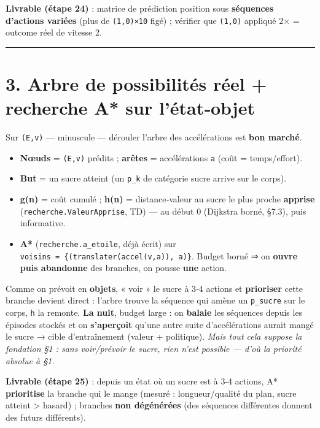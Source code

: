 \documentclass[
  french,
  11pt,
]{article}
\providecommand{\tightlist}{%
  \setlength{\itemsep}{0pt}\setlength{\parskip}{0pt}}
\begin{document}
\textbf{Livrable (étape 24)} : matrice de prédiction position sous
\textbf{séquences d'actions variées} (plus de \texttt{(1,0)×10} figé) ;
vérifier que \texttt{(1,0)} appliqué 2× = outcome réel de vitesse 2.

\begin{center}\rule{0.5\linewidth}{0.5pt}\end{center}

\section{3. Arbre de possibilités réel + recherche A* sur
l'état‑objet}\label{arbre-de-possibilituxe9s-ruxe9el-recherche-a-sur-luxe9tatobjet}

Sur \texttt{(E,v)} --- minuscule --- dérouler l'arbre des accélérations
est \textbf{bon marché}.

\begin{itemize}
\tightlist
\item
  \textbf{Nœuds} = \texttt{(E,v)} prédits ; \textbf{arêtes} =
  accélérations \texttt{a} (coût = temps/effort).
\item
  \textbf{But} = un sucre atteint (un \texttt{p\_k} de catégorie sucre
  arrive sur le corps).
\item
  \textbf{g(n)} = coût cumulé ; \textbf{h(n)} = distance‑valeur au sucre
  le plus proche \textbf{apprise} (\texttt{recherche.ValeurApprise}, TD)
  --- au début 0 (Dijkstra borné, §7.3), puis informative.
\item
  \textbf{A*} (\texttt{recherche.a\_etoile}, déjà écrit) sur
  \texttt{voisins\ =\ \{(translater(accel(v,a)),\ a)\}}. Budget borné ⇒
  on \textbf{ouvre puis abandonne} des branches, on pousse \textbf{une}
  action.
\end{itemize}

Comme on prévoit en \textbf{objets}, « voir » le sucre à 3‑4 actions et
\textbf{prioriser} cette branche devient direct : l'arbre trouve la
séquence qui amène un \texttt{p\_sucre} sur le corps, \texttt{h} la
remonte. \textbf{La nuit}, budget large : on \textbf{balaie} les
séquences depuis les épisodes stockés et on \textbf{s'aperçoit} qu'une
autre suite d'accélérations aurait mangé le sucre → cible d'entraînement
(valeur + politique). \emph{Mais tout cela suppose la fondation §1 :
sans voir/prévoir le sucre, rien n'est possible --- d'où la priorité
absolue à §1.}

\textbf{Livrable (étape 25)} : depuis un état où un sucre est à 3‑4
actions, A* \textbf{prioritise} la branche qui le mange (mesuré :
longueur/qualité du plan, sucre atteint \textgreater{} hasard) ;
branches \textbf{non dégénérées} (des séquences différentes donnent des
futurs différents).
\end{document}

